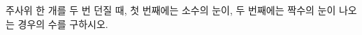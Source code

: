 \hspace*{2mm}\begin{minipage}[t]{\dimexpr\linewidth-2mm\relax}\vspace{0pt}
주사위 한 개를 두 번 던질 때, 첫 번째에는 소수의 눈이, 두 번째에는 짝수의 눈이 나오는 경우의 수를 구하시오.\end{minipage}

